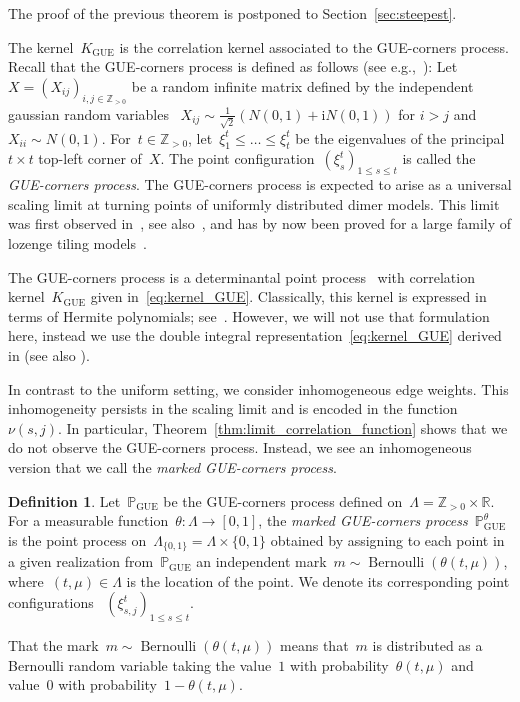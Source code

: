 \documentclass[11pt]{article}
\theoremstyle{plain}
\theoremstyle{definition}
\newtheorem{definition}[theorem]{Definition}
\numberwithin{equation}{section}
\newcommand{\ZZ}{\mathbb{Z}}
\newcommand{\RR}{\mathbb{R}}
\newcommand{\PP}{\mathbb{P}}
\renewcommand{\i}{\mathrm{i}}
\begin{document}
 
The proof of the previous theorem is postponed to Section~\ref{sec:steepest}.

The kernel~$K_{\operatorname{GUE}}$ is the correlation kernel associated to the GUE-corners process. Recall that the GUE-corners process is defined as follows (see e.g.,~\cite{Gor21}): Let~$X=(X_{ij})_{i,j \in\mathbb{Z}_{>0}}$ be a random infinite matrix defined by the independent gaussian random variables ~$X_{ij}\sim \frac{1}{\sqrt{2}}(N(0,1)+\i N(0,1))$ for $i>j$ and ~$X_{ii}\sim N(0,1)$. For~$t\in \ZZ_{>0}$, let~$\xi_1^t\leq \dots\leq \xi_t^t$ be the eigenvalues of the principal~$t\times t$ top-left corner of~$X$. The point configuration~$(\xi_s^t)_{1\leq s\leq t}$ is called the \emph{GUE-corners process}. The GUE-corners process is expected to arise as a universal scaling limit at turning points of uniformly distributed dimer models. This limit was first observed in~\cite{OR06, JN06}, see also~\cite{Joh05a}, and has by now been proved for a large family of lozenge tiling models~\cite{GP15, AG21}.


The GUE-corners process is a determinantal point process~\cite{JN06} with correlation kernel~$K_{\operatorname{GUE}}$ given in~\eqref{eq:kernel_GUE}. Classically, this kernel is expressed in terms of Hermite polynomials; see~\cite{Joh05a, JN06, OR06}. However, we will not use that formulation here, instead we use the double integral representation~\eqref{eq:kernel_GUE} derived in \cite{OR06} (see also \cite{JN06}). 


In contrast to the uniform setting, we consider inhomogeneous edge weights. This inhomogeneity persists in the scaling limit and is encoded in the function~$\nu(s,j)$. In particular, Theorem~\ref{thm:limit_correlation_function} shows that we do not observe the GUE-corners process. Instead, we see an inhomogeneous version that we call the \emph{marked GUE-corners process}.
\begin{definition}\label{def:marked_GUE}
Let~$\PP_{\operatorname{GUE}}$ be the GUE-corners process defined on~$\Lambda=\ZZ_{>0}\times \RR$. For a measurable function~$\theta:\Lambda\to [0,1]$, the \emph{marked GUE-corners process}~$\PP_{\operatorname{GUE}}^\theta$ is the point process on~$\Lambda_{\{0,1\}}=\Lambda \times \{0,1\}$ obtained by assigning to each point in a given realization from~$\PP_{\operatorname{GUE}}$ an independent mark~$m\sim \operatorname{Bernoulli}(\theta(t,\mu))$, where~$(t,\mu)\in \Lambda$ is the location of the point. We denote its corresponding point configurations ~$(\xi_{s,j}^t)_{1\leq s\leq t}$.
\end{definition} 
That the mark~$m\sim \operatorname{Bernoulli}(\theta(t,\mu))$ means that~$m$ is distributed as a Bernoulli random variable taking the value~$1$ with probability~$\theta(t,\mu)$ and value~$0$ with probability~$1-\theta(t,\mu)$. 
\end{document}
